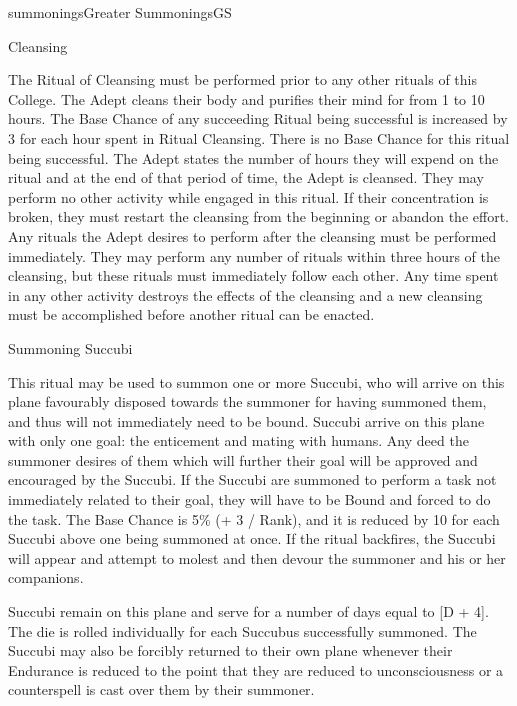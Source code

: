 \begin{College}[1.0]{summonings}{Greater Summonings}{GS}
\begin{ritual}[Q-1]{Cleansing}
\begin{effects}
The Ritual of Cleansing must be performed prior to any other rituals
of this College.  The Adept cleans their body and purifies their mind
for from 1 to 10 hours.  The Base Chance of any succeeding Ritual
being successful is increased by 3 for each hour spent in Ritual
Cleansing. There is no Base Chance for this ritual being successful.
The Adept states the number of hours they will expend on the ritual
and at the end of that period of time, the Adept is cleansed. They may
perform no other activity while engaged in this ritual.  If their
concentration is broken, they must restart the cleansing from the
beginning or abandon the effort.  Any rituals the Adept desires to
perform after the cleansing must be performed immediately.  They may
perform any number of rituals within three hours of the cleansing, but
these rituals must immediately follow each other. Any time spent in
any other activity destroys the effects of the cleansing and a new
cleansing must be accomplished before another ritual can be enacted.
\end{effects}
\end{ritual}

\begin{ritual}[Q-2]{Summoning Succubi}

\begin{effects}
This ritual may be used to summon one or more Succubi, who will arrive
on this plane favourably disposed towards the summoner for having
summoned them, and thus will not immediately need to be bound. Succubi
arrive on this plane with only one goal: the enticement and mating
with humans.  Any deed the summoner desires of them which will further
their goal will be approved and encouraged by the Succubi.  If the
Succubi are summoned to perform a task not immediately related to
their goal, they will have to be Bound and forced to do the task. The
Base Chance is 5\% (+ 3 / Rank), and it is reduced by 10 for each
Succubi above one being summoned at once.  If the ritual backfires,
the Succubi will appear and attempt to molest and then devour the
summoner and his or her companions.

Succubi remain on this plane and serve for a number of days equal to
[D + 4]. The die is rolled individually for each Succubus successfully
summoned. The Succubi may also be forcibly returned to their own plane
whenever their Endurance is reduced to the point that they are reduced
to unconsciousness or a counterspell is cast over them by their
summoner.


\end{effects}
\end{ritual}
\end{College}
